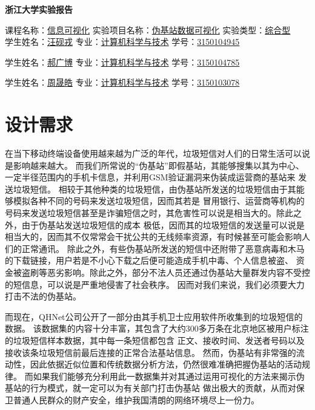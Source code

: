 \documentclass[12pt,a4paper]{article}
\begin{document}
\thispagestyle{plain}
\begin{center}
	{\LARGE \textbf{浙江大学实验报告} \par}
\end{center}
\begin{flushleft}
课程名称：\uline{信息可视化} \hfill 实验项目名称：\uline{伪基站数据可视化} \hfill 实验类型：\uline{综合型} \\

学生姓名：\uline{汪砚戎} \hfill  专业：\uline{计算机科学与技术} \hfill 学号：\uline{3150104945}

学生姓名：\uline{郝广博} \hfill  专业：\uline{计算机科学与技术} \hfill 学号：\uline{3150104785}

学生姓名：\uline{周晟皓} \hfill  专业：\uline{计算机科学与技术} \hfill 学号：\uline{3150103078}

\end{flushleft}

\section{设计需求}

在当下移动终端设备使用越来越为广泛的年代，垃圾短信对人们的日常生活可以说是影响越来越大。
而我们所常说的“伪基站”即假基站，其能够搜集以其为中心、一定半径范围内的手机卡信息，并利用GSM验证漏洞来伪装成运营商的基站来
发送垃圾短信。
相较于其他种类的垃圾短信，由伪基站所发送的垃圾短信由于其能够模拟各种不同的号码来发送垃圾短信，因而其若是
冒用银行、运营商等机构的号码来发送垃圾短信甚至是诈骗短信之时，其危害性可以说是相当大的。除此之外，由于伪基站发送垃圾短信的成本
极低，因而其的垃圾短信的发送量可以说是相当大的，因而其不仅常常会干扰公共的无线频率资源，有时候甚至可能会影响人们的正常通讯。
除此之外，有些伪基站所发送的短信中还附带了恶意病毒和木马的下载链接，用户若是不小心下载之后便可能造成手机中毒、个人信息被盗、
资金被盗刷等恶劣影响。除此之外，部分不法人员还通过伪基站大量群发内容不受控的短信息，可以说是严重地侵害了社会秩序。
因而对我们来说，我们必须要大力打击不法的伪基站。

而现在，QHNet公司公开了一部分由其手机卫士应用软件所收集到的垃圾短信的数据。
该数据集的内容十分丰富，其包含了大约300多万条在北京地区被用户标注的垃圾短信样本数据，其中每一条短信都包含
正文、接收时间、发送者号码以及接收该条垃圾短信前最后连接的正常合法基站信息。
然而，伪基站有非常强的流动性，因此依据近似位置和传统数据分析方法，仍然很难准确把握伪基站的活动规律。
而如果我们能够充分利用此一数据集并对其通过运用可视化的方法来揭示伪基站的行为模式，就一定可以为有关部门打击伪基站
做出极大的贡献，从而对保卫普通人民群众的财产安全，维护我国清朗的网络环境尽上一份力。
\end{document}
